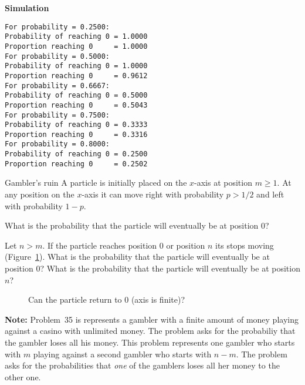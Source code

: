 \textbf{Simulation}
\begin{verbatim}
For probability = 0.2500:
Probability of reaching 0 = 1.0000
Proportion reaching 0     = 1.0000
For probability = 0.5000:
Probability of reaching 0 = 1.0000
Proportion reaching 0     = 0.9612
For probability = 0.6667:
Probability of reaching 0 = 0.5000
Proportion reaching 0     = 0.5043
For probability = 0.7500:
Probability of reaching 0 = 0.3333
Proportion reaching 0     = 0.3316
For probability = 0.8000:
Probability of reaching 0 = 0.2500
Proportion reaching 0     = 0.2502
\end{verbatim}


\begin{prob}{Gambler's ruin}
A particle is initially placed on the $x$-axis at position $m\geq 1$. At any position on the $x$-axis it can move right with probability $p>1/2$ and left with probability $1-p$.

 What is the probability that the particle will eventually be at position $0$?

 Let $n>m$. If the particle reaches position $0$ or position $n$ its stops moving (Figure~\ref{f.ruin3}). What is the probability that the particle will eventually be at position $0$? What is the probability that the particle will eventually be at position $n$?
\begin{figure}[tb]
\begin{center}
\end{center}
\caption{Can the particle return to $0$ (axis is finite)?}\label{f.ruin3}
\end{figure}

\textbf{Note:} Problem~35 is represents a gambler with a finite amount of money playing against a casino with unlimited money. The problem asks for the probabiliy that the gambler loses all his money. This problem represents one gambler who starts with $m$ playing against a second gambler who starts with $n-m$. The problem asks for the probabilities that \emph{one} of the gamblers loses all her money to the other one.

\end{prob}

